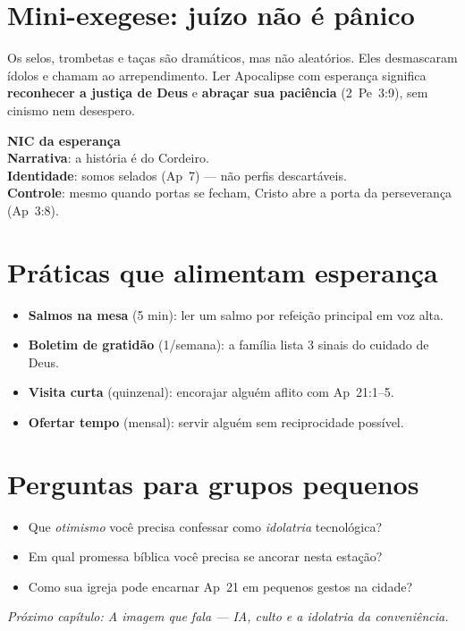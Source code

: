 \section{Mini-exegese: juízo não é pânico}
Os selos, trombetas e taças são dramáticos, mas não aleatórios. Eles desmascaram ídolos e chamam ao arrependimento. Ler Apocalipse com esperança significa \textbf{reconhecer a justiça de Deus} e \textbf{abraçar sua paciência} (2~Pe~3:9), sem cinismo nem desespero.

\begin{nicbox}
\textbf{NIC da esperança}\\
\textbf{Narrativa}: a história é do Cordeiro.\\
\textbf{Identidade}: somos selados (Ap~7) --- não perfis descartáveis.\\
\textbf{Controle}: mesmo quando portas se fecham, Cristo abre a porta da perseverança (Ap~3:8).
\end{nicbox}

\section{Práticas que alimentam esperança}
\begin{checklist}
\begin{itemize}[leftmargin=*,noitemsep]
  \item \textbf{Salmos na mesa} (5 min): ler um salmo por refeição principal em voz alta.
  \item \textbf{Boletim de gratidão} (1/semana): a família lista 3 sinais do cuidado de Deus.
  \item \textbf{Visita curta} (quinzenal): encorajar alguém aflito com Ap~21:1--5.
  \item \textbf{Ofertar tempo} (mensal): servir alguém sem reciprocidade possível.
\end{itemize}
\end{checklist}

\section{Perguntas para grupos pequenos}
\begin{itemize}[leftmargin=*,noitemsep]
  \item Que \textit{otimismo} você precisa confessar como \emph{idolatria} tecnológica?
  \item Em qual promessa bíblica você precisa se ancorar nesta estação?
  \item Como sua igreja pode encarnar Ap~21 em pequenos gestos na cidade?
\end{itemize}

\bigskip
\noindent\textit{Próximo capítulo: A imagem que fala --- IA, culto e a idolatria da conveniência.}
